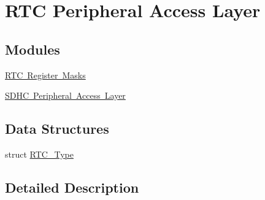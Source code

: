 \hypertarget{group___r_t_c___peripheral___access___layer}{}\section{R\+TC Peripheral Access Layer}
\label{group___r_t_c___peripheral___access___layer}
\subsection*{Modules}
\begin{DoxyCompactItemize}
\item 
\mbox{\hyperlink{group___r_t_c___register___masks}{R\+T\+C Register Masks}}
\item 
\mbox{\hyperlink{group___s_d_h_c___peripheral___access___layer}{S\+D\+H\+C Peripheral Access Layer}}
\end{DoxyCompactItemize}
\subsection*{Data Structures}
\begin{DoxyCompactItemize}
\item 
struct \mbox{\hyperlink{struct_r_t_c___type}{R\+T\+C\+\_\+\+Type}}
\end{DoxyCompactItemize}


\subsection{Detailed Description}

